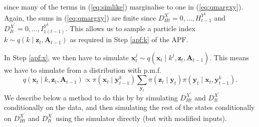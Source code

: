 \documentclass[a4paper]{article}
\newcommand{\bx}{\bm{x}}
\newcommand{\by}{\bm{y}}
\newcommand{\bz}{\bm{z}}
\newcommand{\bA}{\bm{A}}
\begin{document}
since many of the terms in (\ref{eq:simlike}) marginalise to one in (\ref{eq:qmargxy}). Again, the sums in (\ref{eq:qmargxy}) are finite since $D^{X^\prime}_{Ht} = 0, \dots, H^{Y^k}_{t - 1}$ and $D^{X^\prime}_{It} = 0, \dots, I^{Y^k}_{1(t - 1)}$. This allows us to sample a particle index $k \sim q\left(k \mid \bz_t, \bA_{t - 1}\right)$ as required in Step \ref{apf:k} of the APF. 

In Step \ref{apf:x}, we then have to simulate $\bx^j_t \sim q\left(\bx_t \mid k^j, \bz_t, \bA_{t - 1}\right)$. This means we have to simulate from a distribution with p.m.f.
\begin{equation}
    q\left(\bx_t \mid k, \bz_t, \bA_{t - 1}\right) \propto \pi\left(\bx_t \mid \by^k_{t - 1} \right)\sum_{\by_t} \pi\left(\bz_t \mid \by_t\right)\pi\left(\by_t \mid \bx_t, \by^k_{t - 1}\right).\label{eq:qmarg}
\end{equation}
We describe below a method to do this by by simulating $D^{X^\prime}_{Ht}$ and $D^{X^\prime}_{It}$ conditionally on the data, and then simulating the rest of the states conditionally on $D^{X^\prime}_{Ht}$ and $D^{X^\prime}_{It}$ using the simulator directly (but with modified inputs).
\end{document}
